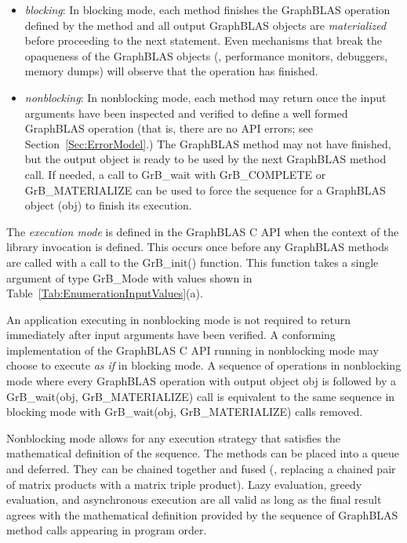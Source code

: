 \begin{itemize}
\item \emph{blocking}: In blocking mode, each method finishes the
GraphBLAS operation defined by the method and all output GraphBLAS
objects are \emph{materialized} before proceeding to the
next statement.  Even mechanisms that break the opaqueness of the
GraphBLAS objects (\eg, performance monitors, debuggers, memory dumps)
will observe that the operation has finished.

\item \emph{nonblocking}: In nonblocking mode, each method may return
once the input arguments have been inspected and verified to define
a well formed GraphBLAS operation (that is, there are no API errors;
see Section~\ref{Sec:ErrorModel}.) The GraphBLAS method may not have
finished, but the output object is ready to be used by the next GraphBLAS
method call.  If needed, a call to {\sf GrB\_wait} with {\sf GrB\_COMPLETE} or 
{\sf GrB\_MATERIALIZE} can be used to force the sequence for a GraphBLAS 
object ({\sf obj}) to finish its execution.
\end{itemize}

The \emph{execution mode} is defined in the GraphBLAS C API when the context of 
the library invocation is defined.  This occurs once before any GraphBLAS
methods are called with a call to the {\sf GrB\_init()} function.
This function takes a single argument of type {\sf GrB\_Mode} with values
shown in Table~\ref{Tab:EnumerationInputValues}(a).

An application executing in nonblocking mode is not required to return
immediately after input arguments have been verified. A conforming
implementation of the GraphBLAS C API running in nonblocking mode may
choose to execute {\it as if} in blocking mode.  A sequence of operations
in nonblocking mode where every GraphBLAS operation with output object
{\sf obj} is followed by a {\sf GrB\_wait(obj, GrB\_MATERIALIZE)} call is 
equivalent to the same sequence in blocking mode with {\sf GrB\_wait(obj, 
GrB\_MATERIALIZE)} calls removed.

Nonblocking mode allows for any execution strategy that satisfies the
mathematical definition of the sequence.  The methods can be placed
into a queue and deferred.  They can be chained together and fused
(\eg, replacing a chained pair of matrix products with a matrix triple
product).  Lazy evaluation, greedy evaluation, and asynchronous execution
are all valid as long as the final result agrees with the mathematical
definition provided by the sequence of GraphBLAS method calls appearing
in  program order.

